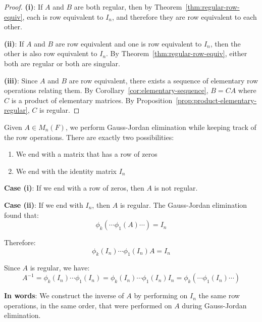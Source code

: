 \begin{proof}
    \textbf{(i)}: If $A$ and $B$ are both regular, then by Theorem~\ref{thm:regular-row-equiv}, each is row equivalent to $I_n$, and therefore they are row equivalent to each other.
    
    \textbf{(ii)}: If $A$ and $B$ are row equivalent and one is row equivalent to $I_n$, then the other is also row equivalent to $I_n$. By Theorem~\ref{thm:regular-row-equiv}, either both are regular or both are singular.
    
    \textbf{(iii)}: Since $A$ and $B$ are row equivalent, there exists a sequence of elementary row operations relating them. By Corollary~\ref{cor:elementary-sequence}, $B = CA$ where $C$ is a product of elementary matrices. By Proposition~\ref{prop:product-elementary-regular}, $C$ is regular.
\end{proof}
\begin{note}
    Given $A \in M_n(F)$, we perform Gauss-Jordan elimination while keeping track of the row operations. There are exactly two possibilities:
    \begin{enumerate}[label=(\roman*)]
        \item We end with a matrix that has a row of zeros
        \item We end with the identity matrix $I_n$
    \end{enumerate}
\end{note}

\begin{note}
    \textbf{Case (i)}: If we end with a row of zeros, then $A$ is not regular.
    
    \textbf{Case (ii)}: If we end with $I_n$, then $A$ is regular. The Gauss-Jordan elimination found that:
    \[
    \phi_k(\cdots \phi_1(A) \cdots) = I_n
    \]
    
    Therefore:
    \[
    \phi_k(I_n) \cdots \phi_1(I_n) A = I_n
    \]
    
    Since $A$ is regular, we have:
    \[
    A^{-1} = \phi_k(I_n) \cdots \phi_1(I_n) = \phi_k(I_n) \cdots \phi_1(I_n) I_n = \phi_k(\cdots \phi_1(I_n) \cdots)
    \]
    
    \textbf{In words}: We construct the inverse of $A$ by performing on $I_n$ the same row operations, in the same order, that were performed on $A$ during Gauss-Jordan elimination.
\end{note}

